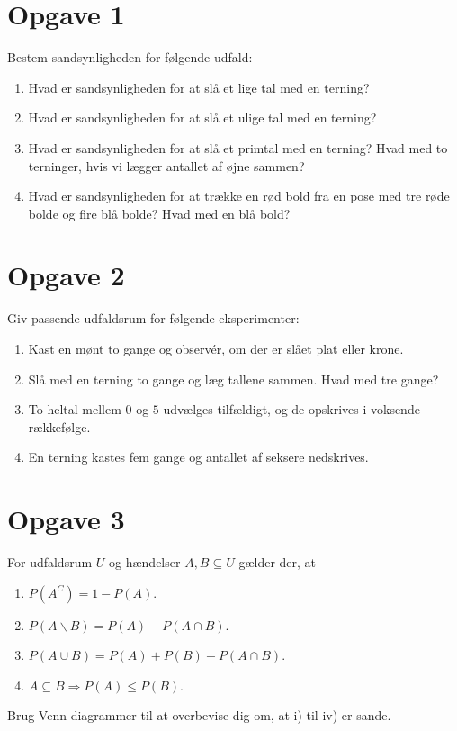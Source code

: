 \section*{Opgave 1}
Bestem sandsynligheden for følgende udfald:
\begin{enumerate}[label=\roman*)]
\item Hvad er sandsynligheden for at slå et lige tal med en terning?
\item Hvad er sandsynligheden for at slå et ulige tal med en terning?
\item Hvad er sandsynligheden for at slå et primtal med en terning? Hvad med to terninger, hvis vi lægger antallet af øjne sammen?
\item Hvad er sandsynligheden for at trække en rød bold fra en pose med tre røde bolde og fire blå bolde? Hvad med en blå bold?

\end{enumerate}
\section*{Opgave 2}
Giv passende udfaldsrum for følgende eksperimenter:
\begin{enumerate}[label=\roman*)]
\item Kast en mønt to gange og observér, om der er slået plat eller krone. 
\item Slå med en terning to gange og læg tallene sammen. Hvad med tre gange?
\item To heltal mellem $0$ og $5$ udvælges tilfældigt, og de opskrives i voksende rækkefølge.
\item En terning kastes fem gange og antallet af seksere nedskrives.
\end{enumerate}
\section*{Opgave 3}
For udfaldsrum $U$ og hændelser $A,B\subseteq U$ gælder der, at 
\begin{enumerate}[label=\roman*)]
\item $P(A^C) = 1-P(A)$.
\item $P(A \backslash B) = P(A) - P(A\cap B)$.
\item $P(A\cup B) = P(A)+P(B)-P(A\cap B)$.
\item $A\subseteq B \Rightarrow P(A)\leq P(B).$ 
\end{enumerate}
Brug Venn-diagrammer til at overbevise dig om, at i) til iv) er sande.
